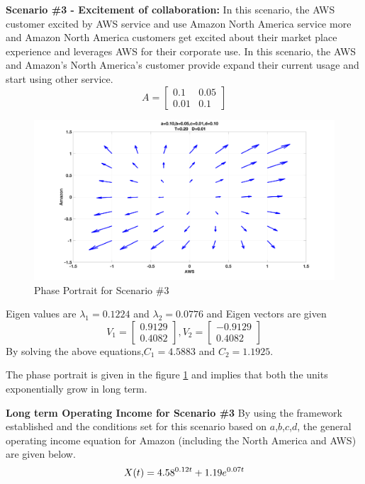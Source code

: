 \documentclass[fleqn,10pt]{SelfArx} %
\begin{document}
\textbf{Scenario \#3 - Excitement of collaboration:}
In this scenario, the AWS customer excited by AWS service and use Amazon North America service more and Amazon North America customers get excited about their market place experience and leverages AWS for their corporate use. In this scenario, the AWS and Amazon's North America's customer provide expand their current usage and start using other service. 
\[
A =
\begin{bmatrix}
0.1 & 0.05 \\
0.01 & 0.1
\end{bmatrix}
\]
\begin{figure}[ht]\centering
\includegraphics[width=\linewidth]{scen3}
\caption{Phase Portrait for Scenario \#3}
\label{fig:scen3}
\end{figure}  
Eigen values are $\lambda_1 = 0.1224$ and $\lambda_2 = 0.0776$ and Eigen vectors are given 
\[
V_1 =
\begin{bmatrix}
0.9129  \\
0.4082 
\end{bmatrix}
,V_2 =
\begin{bmatrix}
-0.9129  \\
0.4082
\end{bmatrix}
\]
By solving the above equations,$C_1=4.5883$ and $C_2=1.1925$.

The phase portrait is given in the figure \ref{fig:scen3} and implies that both the units exponentially grow in long term. 

\textbf{Long term Operating Income for Scenario \#3}
By using the framework established and the conditions set for this scenario based on $a$,$b$,$c$,$d$, the general operating income equation for Amazon (including the North America and AWS) are given below. 
\begin{equation} \centering
X(t) = 4.58^{0.12 t} + 1.19 e^{0.07 t}
\label{eq:s3}
\end{equation}
\end{document}
